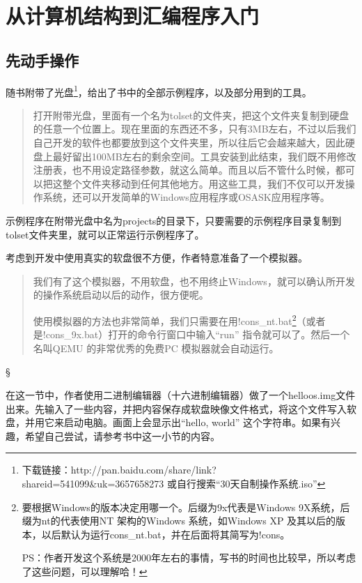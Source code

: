 ﻿\chapter{	从计算机结构到汇编程序入门	}
\section{	先动手操作	}
\label{start}
随书附带了光盘\footnote{下载链接：http://pan.baidu.com/share/link?shareid=541099\&uk=3657658273 或自行搜索“30天自制操作系统.iso”}，给出了书中的全部示例程序，以及部分用到的工具。
\begin{quote}
打开附带光盘，里面有一个名为tolset的文件夹，把这个文件夹复制到硬盘的任意一个位置上。现在里面的东西还不多，只有3MB左右，不过以后我们自己开发的软件也都要放到这个文件夹里，所以往后它会越来越大，因此硬盘上最好留出100MB左右的剩余空间。工具安装到此结束，我们既不用修改注册表，也不用设定路径参数，就这么简单。而且以后不管什么时候，都可以把这整个文件夹移动到任何其他地方。用这些工具，我们不仅可以开发操作系统，还可以开发简单的Windows应用程序或OSASK应用程序等。
\end{quote}

示例程序在附带光盘中名为projects的目录下，只要需要的示例程序目录复制到tolset文件夹里，就可以正常运行示例程序了。

考虑到开发中使用真实的软盘很不方便，作者特意准备了一个模拟器。

\begin{quote}
我们有了这个模拟器，不用软盘，也不用终止Windows，就可以确认所开发的操作系统启动以后的动作，很方便呢。

使用模拟器的方法也非常简单，我们只需要在用!cons\_nt.bat\footnote{要根据Windows的版本决定用哪一个。后缀为9x代表是Windows 9X系统，后缀为nt的代表使用NT 架构的Windows 系统，如Windows XP 及其以后的版本，以后默认为运行cons\_nt.bat，并在后面将其简写为!cons。\par
PS：作者开发这个系统是2000年左右的事情，写书的时间也比较早，所以考虑了这些问题，可以理解哈！}（或者是!cons\_9x.bat）打开的命令行窗口中输入“run” 指令就可以了。然后一个名叫QEMU 的非常优秀的免费PC 模拟器就会自动运行。
\end{quote}

\begin{center}
\S
\end{center}

在这一节中，作者使用二进制编辑器（十六进制编辑器）做了一个helloos.img文件出来。先输入了一些内容，并把内容保存成软盘映像文件格式，将这个文件写入软盘，并用它来启动电脑。画面上会显示出“hello, world” 这个字符串。如果有兴趣，希望自己尝试，请参考书中这一小节的内容。

